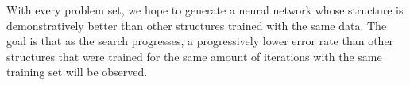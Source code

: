 With every problem set, we hope to generate a neural network whose structure is demonstratively better than other structures trained with the same data.
The goal is that as the search progresses, a progressively lower error rate than other structures that were trained for the same amount of iterations with the same training set will be observed.

